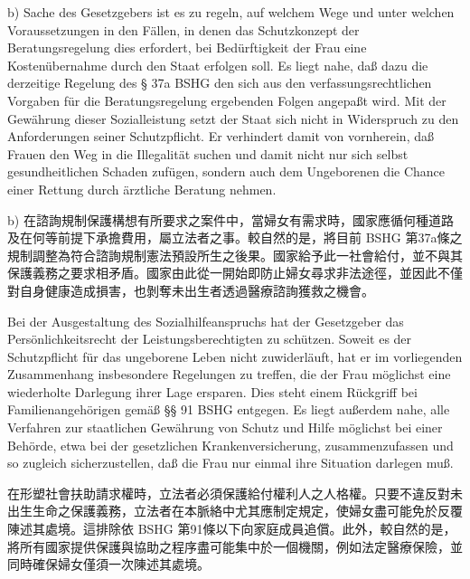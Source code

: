 \documentclass[12pt]{article}
\begin{document}
\begin{sourcepara}[title={原文E.220}]
b) Sache des Gesetzgebers ist es zu regeln, auf welchem Wege und unter welchen Voraussetzungen in den Fällen, in denen das Schutzkonzept der Beratungsregelung dies erfordert, bei Bedürftigkeit der Frau eine Kostenübernahme durch den Staat erfolgen soll. Es liegt nahe, daß dazu die derzeitige Regelung des § 37a BSHG den sich aus den verfassungsrechtlichen Vorgaben für die Beratungsregelung ergebenden Folgen angepaßt wird. Mit der Gewährung dieser Sozialleistung setzt der Staat sich nicht in Widerspruch zu den Anforderungen seiner Schutzpflicht. Er verhindert damit von vornherein, daß Frauen den Weg in die Illegalität suchen und damit nicht nur sich selbst gesundheitlichen Schaden zufügen, sondern auch dem Ungeborenen die Chance einer Rettung durch ärztliche Beratung nehmen.
\end{sourcepara}
\begin{transpara}
b) 在諮詢規制保護構想有所要求之案件中，當婦女有需求時，國家應循何種道路及在何等前提下承擔費用，屬立法者之事。較自然的是，將目前 BSHG 第37a條之規制調整為符合諮詢規制憲法預設所生之後果。國家給予此一社會給付，並不與其保護義務之要求相矛盾。國家由此從一開始即防止婦女尋求非法途徑，並因此不僅對自身健康造成損害，也剝奪未出生者透過醫療諮詢獲救之機會。
\end{transpara}

\begin{sourcepara}[title={原文E.221}]
Bei der Ausgestaltung des Sozialhilfeanspruchs hat der Gesetzgeber das Persönlichkeitsrecht der Leistungsberechtigten zu schützen. Soweit es der Schutzpflicht für das ungeborene Leben nicht zuwiderläuft, hat er im vorliegenden Zusammenhang insbesondere Regelungen zu treffen, die der Frau möglichst eine wiederholte Darlegung ihrer Lage ersparen. Dies steht einem Rückgriff bei Familienangehörigen gemäß §§ 91 \abbrF{} BSHG entgegen. Es liegt außerdem nahe, alle Verfahren zur staatlichen Gewährung von Schutz und Hilfe möglichst bei einer Behörde, etwa bei der gesetzlichen Krankenversicherung, zusammenzufassen und so zugleich sicherzustellen, daß die Frau nur einmal ihre Situation darlegen muß.
\end{sourcepara}
\begin{transpara}
在形塑社會扶助請求權時，立法者必須保護給付權利人之人格權。只要不違反對未出生生命之保護義務，立法者在本脈絡中尤其應制定規定，使婦女盡可能免於反覆陳述其處境。這排除依 BSHG 第91條以下向家庭成員追償。此外，較自然的是，將所有國家提供保護與協助之程序盡可能集中於一個機關，例如法定醫療保險，並同時確保婦女僅須一次陳述其處境。
\end{transpara}
\end{document}
